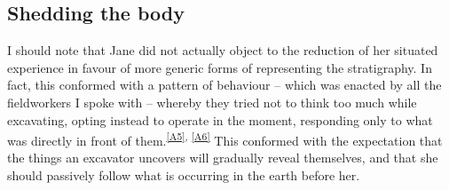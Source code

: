 
\subsection*{Shedding the body}
I should note that Jane did not actually object to the reduction of her situated experience in favour of more generic forms of representing the stratigraphy.
In fact, this conformed with a pattern of behaviour -- which was enacted by all the fieldworkers I spoke with -- whereby they tried not to think too much while excavating, opting instead to operate in the moment, responding only to what was directly in front of them.\textsuperscript{\ref{A5}, \ref{A6}}
This conformed with the expectation that the things an excavator uncovers will gradually reveal themselves, and that she should passively follow what is occurring in the earth before her.

